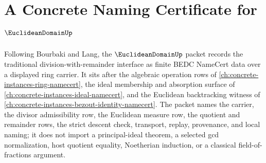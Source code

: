 \chapter{A Concrete Naming Certificate for $\EuclideanDomainUp$}
\label{ch:concrete-instances-euclidean-domain-namecert}

Following Bourbaki and Lang, the $\EuclideanDomainUp$ packet records the traditional division-with-remainder interface as finite BEDC NameCert data over a displayed ring carrier. It sits after the algebraic operation rows of \autoref{ch:concrete-instances-ring-namecert}, the ideal membership and absorption surface of \autoref{ch:concrete-instances-ideal-namecert}, and the Euclidean backtracking witness of \autoref{ch:concrete-instances-bezout-identity-namecert}. The packet names the carrier, the divisor admissibility row, the Euclidean measure row, the quotient and remainder rows, the strict descent check, transport, replay, provenance, and local naming; it does not import a principal-ideal theorem, a selected gcd normalization, host quotient equality, Noetherian induction, or a classical field-of-fractions argument.

